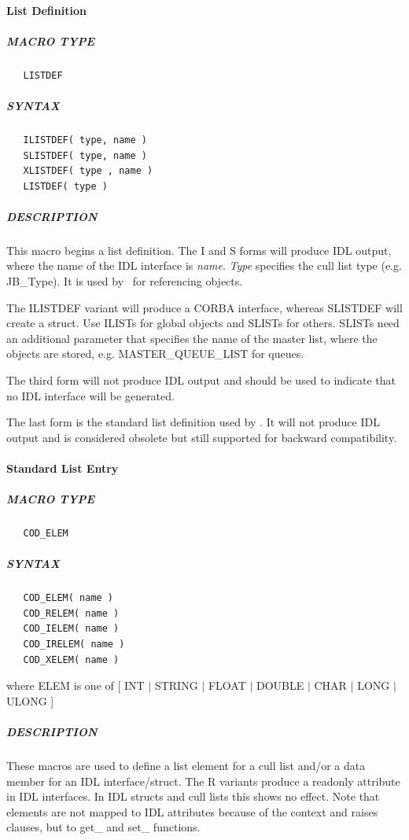 \paragraph{List Definition}
\subparagraph{MACRO TYPE}
\begin{verbatim}
   LISTDEF
\end{verbatim}

\subparagraph{SYNTAX}
\begin{verbatim}
   ILISTDEF( type, name )
   SLISTDEF( type, name )
   XLISTDEF( type , name )
   LISTDEF( type )
\end{verbatim}

\subparagraph*{DESCRIPTION}
   This macro begins a list definition. The I and S forms will produce
   IDL output, where the name of the IDL interface is {\it name}. {\it Type}
   specifies the cull list type (e.g. JB\_Type). It is used by \qidl\
   for referencing objects.
      
   The ILISTDEF variant will produce a CORBA interface, whereas 
   SLISTDEF will create a struct. Use ILISTs for global
   objects and SLISTs for others. SLISTs need an additional parameter that
   specifies the name of the master list, where the objects are stored, e.g.
   MASTER\_QUEUE\_LIST for queues.
   
   The third form will not produce IDL output and should be used
   to indicate that no IDL interface will be generated.
   
   The last form is the standard list definition used by \codine. It will
   not produce IDL output and is considered obsolete but still supported
   for backward compatibility.

\paragraph{Standard List Entry}
\subparagraph{MACRO TYPE}
\begin{verbatim}
   COD_ELEM
\end{verbatim}

\subparagraph{SYNTAX}
\begin{verbatim}
   COD_ELEM( name )
   COD_RELEM( name )
   COD_IELEM( name )
   COD_IRELEM( name )
   COD_XELEM( name )
\end{verbatim}
   
   where ELEM is one of [ INT $|$ STRING $|$ FLOAT $|$ DOUBLE $|$ CHAR 
   $|$ LONG $|$ ULONG ]

\subparagraph{DESCRIPTION}
   These macros are used to define a list element for a cull list and/or a
   data member for an IDL interface/struct. The R variants produce a
   readonly attribute in IDL interfaces. In IDL structs and cull lists this
   shows no effect. Note that elements are not mapped to IDL attributes
   because of the context and raises clauses, but to get\_ and set\_ functions.

